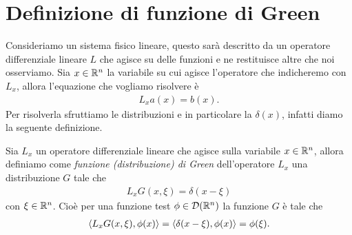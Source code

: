 \section{Definizione di funzione di Green}
Consideriamo un sistema fisico lineare, questo sarà descritto da un operatore differenziale lineare $ L $ che agisce 
su delle funzioni e ne restituisce altre che noi osserviamo. Sia $ x \in \mathbb{R}^n $ la variabile su cui agisce l'operatore che indicheremo con 
$ L_x $, allora l'equazione che vogliamo risolvere è 
\begin{align}
  L_x a(x) = b(x).
\end{align}
Per risolverla sfruttiamo le distribuzioni e in particolare la $ \delta(x) $, infatti diamo la seguente definizione.
\begin{definition}
  Sia $ L_x $ un operatore differenziale lineare che agisce sulla variabile $ x \in \mathbb{R}^n $, allora definiamo come 
  \textit{funzione (distribuzione) di Green} 
  dell'operatore $ L_x $ una distribuzione $ G $ tale che 
  \begin{align}
    L_xG(x, \xi) = \delta(x -\xi)
  \end{align}
  con $ \xi \in \mathbb{R}^n $.
  Cioè per una funzione test $ \phi \in \D(\R^n) $ la funzione $ G $ è tale che 
  \begin{align}
    \sca{L_xG(x, \xi), \phi(x)} = \sca{\delta(x - \xi), \phi(x)} = \phi(\xi).
  \end{align}
\end{definition}


